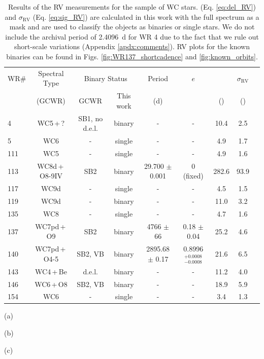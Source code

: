 \begin{table}
\small
\setlength{\tabcolsep}{0pt}
\centering
\caption{Results of the RV measurements for the sample of WC stars. \DelRV{} (Eq. \ref{eq:del_RV}) and $\sigma_\textrm{RV}$ (Eq. \ref{eq:sig_RV}) are calculated in this work with the full spectrum as a mask and are used to classify the objects as binaries or single stars. We do not include the archival period of 2.4096~d for WR 4 due to the fact that we rule out short-scale variations (Appendix \ref{apdx:comments}). RV plots for the known binaries can be found in Figs. \ref{fig:WR137_shortcadence} and \ref{fig:known_orbits}.}

\begin{threeparttable}
\centering
\begin{tabular*}{\textwidth}{l @{\extracolsep{\fill}}*{8}{c}}
\toprule
\toprule

WR\# & Spectral Type & \multicolumn{2}{c}{Binary Status}  & Period & $e$ & \DelRV{}  & $\sigma_\textrm{RV}$  \\ \cline{3-4}
 & (GCWR) & GCWR & This work & (d) & &(\kms{}) &(\kms{})\\\hline
 \midrule
4 & WC5\,+\,? & SB1, no d.e.l. & binary & - & - & 10.4 & 2.5\\
5 & WC6 & - & single & - & - & 4.9 & 1.7\\
111 & WC5 & - & single & - & - & 4.9 & 1.6\\
113 & WC8d\,+\,O8-9IV & SB2 & binary & 29.700 $\pm$ 0.001\tnote{(a)} & 0 (fixed)\tnote{(a)} & 282.6 & 93.9\\
117 & WC9d & - & single & - & - & 4.5 & 1.5\\
119 & WC9d & - & binary & - & - & 11.0 & 3.2\\
135 & WC8 & - & single & - & - & 4.7 & 1.6\\
137 & WC7pd\,+\,O9 & SB2 & binary & 4766 $\pm$ 66\tnote{(b)} & 0.18 $\pm$ 0.04\tnote{(b)} & 25.2 & 4.6\\
140 & WC7pd\,+\,O4-5 & SB2, VB & binary & 2895.68 $\pm$ 0.17\tnote{(c)} & 0.8996$^{+0.0008}_{-0.0008}$\tnote{(c)} & 21.6 & 6.5\\
143 & WC4\,+\,Be & d.e.l. & binary & - & - & 11.2 & 4.0\\
146 & WC6\,+\,O8 & SB2, VB & binary & - & - & 18.9 & 5.9\\
154 & WC6 & - & single & - & - & 3.4 & 1.3\\ %
\bottomrule
\end{tabular*}
\begin{tablenotes}
    \item[(a)] \citet{david-uraz_using_2012}
    \item[(b)] \citet{lefevre_spectroscopic_2005}
    \item[(c)] \citet{thomas_orbit_2021}
\end{tablenotes}
\end{threeparttable}
\label{tab:WC_data}
\end{table}
